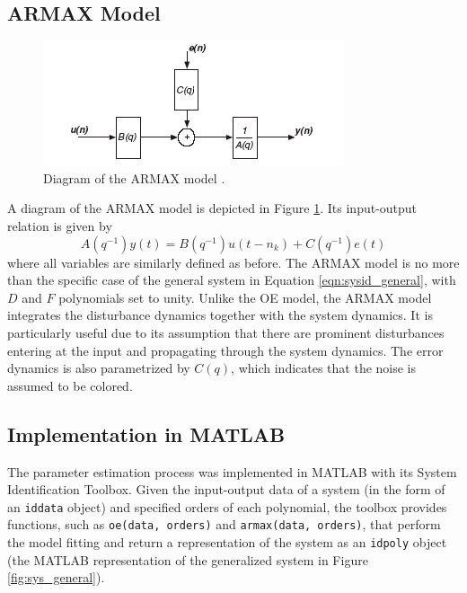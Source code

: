 \subsection{ARMAX Model}

\begin{figure}[h]
    \centering
    \includegraphics{figures/armax.png}
    \caption{Diagram of the ARMAX model \cite{ni}.}
    \label{fig:armax}
\end{figure}

A diagram of the ARMAX model is depicted in Figure \ref{fig:armax}. Its input-output relation is given by
\begin{equation}
    \label{eqn:armax}
    A(q^{-1}) y(t) = {B(q^{-1})} u(t-n_k) + {C(q^{-1})} e(t)
\end{equation}
where all variables are similarly defined as before. The ARMAX model is no more than the specific case of the general system in Equation \ref{eqn:sysid_general}, with $D$ and $F$ polynomials set to unity. Unlike the OE model, the ARMAX model integrates the disturbance dynamics together with the system dynamics. It is particularly useful due to its assumption that there are prominent disturbances entering at the input and propagating through the system dynamics. The error dynamics is also parametrized by $C(q)$, which indicates that the noise is assumed to be colored. 

\subsection{Implementation in MATLAB}

The parameter estimation process was implemented in MATLAB with its System Identification Toolbox. Given the input-output data of a system (in the form of an \texttt{iddata} object) and specified orders of each polynomial, the toolbox provides functions, such as \texttt{oe(data, orders)} and \texttt{armax(data, orders)}, that perform the model fitting and return a representation of the system as an \texttt{idpoly} object (the MATLAB representation of the generalized system in Figure \ref{fig:sys_general}). 

